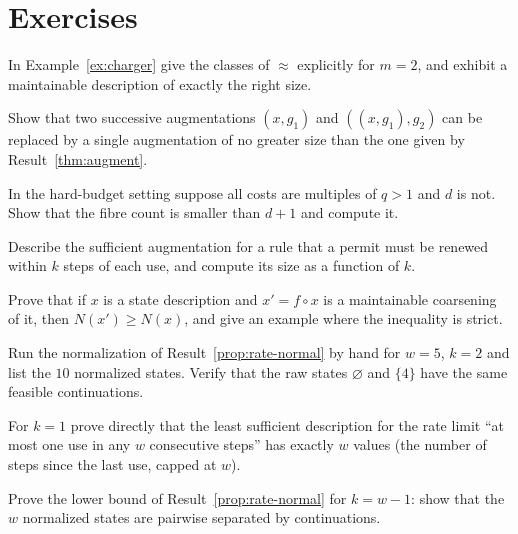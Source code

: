 \section*{Exercises}

\begin{exercise}
In Example~\ref{ex:charger} give the classes of $\approx$ explicitly for $m=2$, and exhibit a maintainable description of exactly the right size.
\end{exercise}

\begin{exercise}
Show that two successive augmentations $(x,g_1)$ and $((x,g_1),g_2)$ can be replaced by a single augmentation of no greater size than the one given by Result~\ref{thm:augment}.
\end{exercise}

\begin{exercise}
In the hard-budget setting suppose all costs are multiples of $q>1$ and $d$ is not. Show that the fibre count is smaller than $d+1$ and compute it.
\end{exercise}

\begin{exercise}
Describe the sufficient augmentation for a rule that a permit must be renewed within $k$ steps of each use, and compute its size as a function of $k$.
\end{exercise}

\begin{exercise}
Prove that if $x$ is a state description and $x'=f\circ x$ is a maintainable coarsening of it, then $N(x')\ge N(x)$, and give an example where the inequality is strict.
\end{exercise}

\begin{exercise}
Run the normalization of Result~\ref{prop:rate-normal} by hand for $w=5$, $k=2$ and list the $10$ normalized states. Verify that the raw states $\varnothing$ and $\{4\}$ have the same feasible continuations.
\end{exercise}

\begin{exercise}
For $k=1$ prove directly that the least sufficient description for the rate limit ``at most one use in any $w$ consecutive steps'' has exactly $w$ values (the number of steps since the last use, capped at $w$).
\end{exercise}

\begin{exercise}
Prove the lower bound of Result~\ref{prop:rate-normal} for $k=w-1$: show that the $w$ normalized states are pairwise separated by continuations.
\end{exercise}

